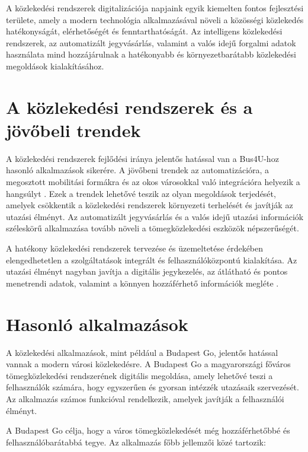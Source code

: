 A közlekedési rendszerek digitalizációja napjaink egyik kiemelten fontos fejlesztési területe, amely a modern technológia alkalmazásával növeli a közösségi közlekedés hatékonyságát, elérhetőségét és fenntarthatóságát. Az intelligens közlekedési rendszerek, az automatizált jegyvásárlás, valamint a valós idejű forgalmi adatok használata mind hozzájárulnak a hatékonyabb és környezetbarátabb közlekedési megoldások kialakításához. 

\section{A közlekedési rendszerek és a jövőbeli trendek}

A közlekedési rendszerek fejlődési iránya jelentős hatással van a Bus4U-hoz hasonló alkalmazások sikerére. A jövőbeni trendek az automatizációra, a megosztott mobilitási formákra és az okos városokkal való integrációra helyezik a hangsúlyt {\cite{levinson_transport}}. Ezek a trendek lehetővé teszik az olyan megoldások terjedését, amelyek csökkentik a közlekedési rendszerek környezeti terhelését és javítják az utazási élményt. Az automatizált jegyvásárlás és a valós idejű utazási információk széleskörű alkalmazása tovább növeli a tömegközlekedési eszközök népszerűségét.

A hatékony közlekedési rendszerek tervezése és üzemeltetése érdekében elengedhetetlen a szolgáltatások integrált és felhasználóközpontú kialakítása. Az utazási élményt nagyban javítja a digitális jegykezelés, az átlátható és pontos menetrendi adatok, valamint a könnyen hozzáférhető információk megléte \cite{ceder_transit}.

\section{Hasonló alkalmazások}

A közlekedési alkalmazások, mint például a Budapest Go, jelentős hatással vannak a modern városi közlekedésre. A Budapest Go a magyarországi főváros tömegközlekedési rendszerének digitális megoldása, amely lehetővé teszi a felhasználók számára, hogy egyszerűen és gyorsan intézzék utazásaik szervezését. Az alkalmazás számos funkcióval rendelkezik, amelyek javítják a felhasználói élményt.

A Budapest Go célja, hogy a város tömegközlekedését még hozzáférhetőbbé és felhasználóbarátabbá tegye. Az alkalmazás főbb jellemzői közé tartozik:

